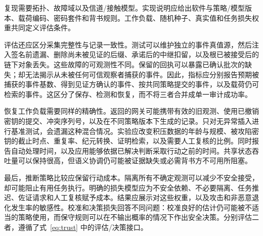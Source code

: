 复现需要拓扑、故障域以及信道/接触模型。实现说明应给出软件与策略/模型版本、载荷编码、密码套件和背书规则。工作负载、随机种子、真实值和任务损失权重共同定义评估条件。

评估还应区分采集完整性与记录一致性。测试可以维护独立的事件真值源，然后注入签名前遗漏、删除尚未被见证的后缀、承诺后的中继扣留，以及根已被接受后的链下对象丢失。这些故障的可观测性不同。保留的回执可以暴露已确认批次的缺失；却无法揭示从未被任何可信观察者捕获的事件。因此，指标应分别报告预期被捕获的事件基数、得到见证方确认的事件、按共同策略提交的事件，以及载荷仍可检索的事件。这区分了保存、检测和恢复，而不将三者合并成单一审计成功率。

恢复工作负载需要同样的精确性。返回的网关可能携带有效的旧观测、使用已撤销密钥的提交、冲突序列号，以及在不同策略版本下生成的记录。只对无异常插入进行基准测试，会遗漏这种混合情况。实验应改变积压数据的年龄与规模、被攻陷密钥的截止时点、重复率、纪元转换、证明检索，以及需要人工复核的比例。同时报告自动处理时间，以及应用能够依据已解决判断采取行动之前的时间。共享状态吞吐量可以保持很高，但语义协调仍可能被证据缺失或必需背书方不可用所阻塞。

最后，推断策略比较应保留行动成本。隔离所有不确定观测可以减少不安全接受，却可能阻止有用任务执行。明确的损失模型应为不安全依赖、不必要隔离、任务推迟、佐证请求和人工复核赋予成本。结果应展示对这些权重，以及攻击和非恶意退化发生率的敏感性。校准和决策损失回答不同问题：校准良好的估计仍可能被不适当的策略使用，而保守规则可以在不输出概率的情况下作出安全决策。分别评估二者，遵循了式~\eqref{eq:trust} 中的评估/决策接口。
